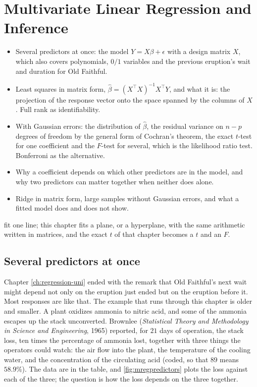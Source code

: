 \chapter{Multivariate Linear Regression and Inference}
\label{ch:regression-multi}

\begin{chaptergoals}
\begin{itemize}[nosep]
\item Several predictors at once: the model $Y = X\beta + \epsilon$ with a design matrix $X$, which also covers polynomials, $0/1$ variables and the previous eruption's wait and duration for Old Faithful.
\item Least squares in matrix form, $\hat{\beta} = (X^\top X)^{-1}X^\top Y$, and what it is: the projection of the response vector onto the space spanned by the columns of $X$. Full rank as identifiability.
\item With Gaussian errors: the distribution of $\hat{\beta}$, the residual variance on $n - p$ degrees of freedom by the general form of Cochran's theorem, the exact $t$-test for one coefficient and the $F$-test for several, which is the likelihood ratio test. Bonferroni as the alternative.
\item Why a coefficient depends on which other predictors are in the model, and why two predictors can matter together when neither does alone.
\item Ridge in matrix form, large samples without Gaussian errors, and what a fitted model does and does not show.
\end{itemize}
 fit one line; this chapter fits a plane, or a hyperplane, with the same arithmetic written in matrices, and the exact $t$ of that chapter becomes a $t$ and an $F$.
\end{chaptergoals}

\section{Several predictors at once}
\label{sec:mreg-model}

Chapter \ref{ch:regression-uni} ended with the remark that Old Faithful's next wait might depend not only on the eruption just ended but on the eruption before it.
Most responses are like that.
The example that runs through this chapter is older and smaller.
A plant oxidizes ammonia to nitric acid, and some of the ammonia escapes up the stack unconverted.
Brownlee (\textit{Statistical Theory and Methodology in Science and Engineering}, 1965) reported, for $21$ days of operation, the stack loss, ten times the percentage of ammonia lost, together with three things the operators could watch: the air flow into the plant, the temperature of the cooling water, and the concentration of the circulating acid (coded, so that $89$ means $58.9\%$).
The data are in the table, and \cref{fig:mregpredictors} plots the loss against each of the three; the question is how the loss depends on the three together.

